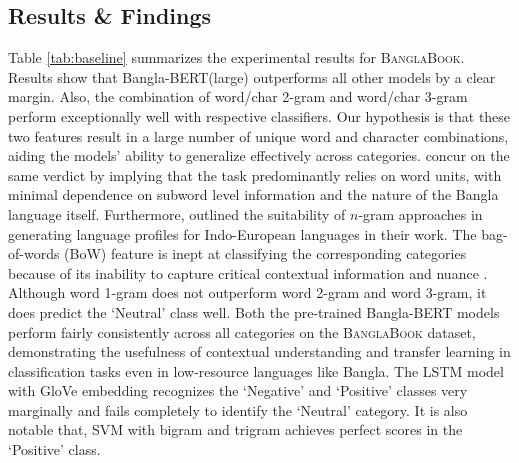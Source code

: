 







\subsection{Results \& Findings}
Table \ref{tab:baseline} summarizes the experimental results for \textsc{BanglaBook}. Results show that Bangla-BERT{\selectfont(large)} outperforms all other models by a clear margin. Also, the combination of word/char 2-gram and word/char 3-gram perform exceptionally well with respective classifiers. Our hypothesis is that these two features result in a large number of unique word and character combinations, aiding the models' ability to generalize effectively across categories. \citet{islam2022emonoba,islam2021sentnob,taher2018n} concur on the same verdict by implying that the task predominantly relies on word units, with minimal dependence on subword level information and the nature of the Bangla language itself. Furthermore, \citet{majumder2002n} outlined the suitability of $n$-gram approaches in generating language profiles for Indo-European languages in their work. The bag-of-words (BoW) feature is inept at classifying the corresponding categories because of its inability to capture critical contextual information and nuance \cite{zheng2018feature}. Although word 1-gram does not outperform word 2-gram and word 3-gram, it does predict the `Neutral' class well. Both the pre-trained Bangla-BERT models perform fairly consistently across all categories on the \textsc{BanglaBook} dataset, demonstrating the usefulness of contextual understanding and transfer learning in classification tasks even in low-resource languages like Bangla. The LSTM model with GloVe embedding recognizes the `Negative' and `Positive' classes very marginally and fails completely to identify the `Neutral' category. It is also notable that, SVM with bigram and trigram achieves perfect scores in the `Positive' class.

